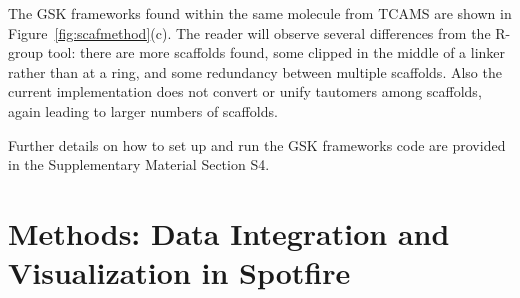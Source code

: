 \documentclass[journal=jacsat,manuscript=article]{achemso}
\newcommand*\fref[1]{Figure~\ref{fig:#1}}
\begin{document}
The GSK frameworks found within the same molecule from TCAMS are shown
in \fref{scafmethod}(c).  The reader will observe several differences
from the R-group tool: there are more scaffolds found, some clipped in
the middle of a linker rather than at a ring, and some redundancy
between multiple scaffolds. Also the current implementation does not
convert or unify tautomers among scaffolds, again leading to larger
numbers of scaffolds. %

Further details on how to set up and run the GSK frameworks code are
provided in the Supplementary Material Section S4. %

%
%


\section{Methods: Data Integration and Visualization in Spotfire}
\label{sec:methods2}
\end{document}

